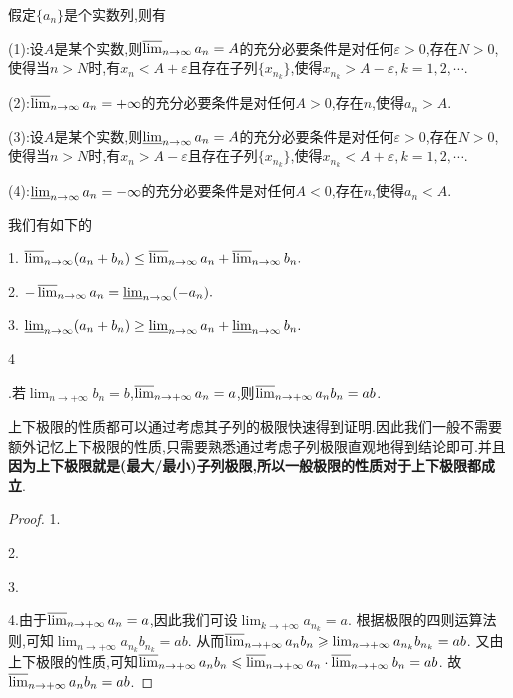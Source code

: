 \documentclass[lang=cn,newtx,10pt,scheme=chinese]{elegantbook}
\begin{document}
\begin{proposition}[上下极限的等价定义]\label{proposition:上下极限的等价定义}
假定\(\{a_n\}\)是个实数列,则有

(1):设\(A\)是某个实数,则\(\varlimsup_{n \to \infty} a_n = A\)的充分必要条件是对任何\(\varepsilon > 0\),存在$N>0$,使得当$n>N$时,有$x_n<A+\varepsilon$且存在子列$\{x_{n_k}\}$,使得$x_{n_k}>A-\varepsilon,k=1,2,\cdots$.

(2):\(\varlimsup_{n \to \infty} a_n = +\infty\)的充分必要条件是对任何\(A > 0\),存在\(n\),使得\(a_n > A\).

(3):设\(A\)是某个实数,则\(\varliminf_{n \to \infty} a_n = A\)的充分必要条件是对任何\(\varepsilon > 0\),存在$N>0$,使得当$n>N$时,有$x_n>A-\varepsilon$且存在子列$\{x_{n_k}\}$,使得$x_{n_k}<A+\varepsilon,k=1,2,\cdots$.

(4):\(\varliminf_{n \to \infty} a_n = -\infty\)的充分必要条件是对任何\(A < 0\),存在\(n\),使得\(a_n < A\).
\end{proposition}

\begin{proposition}[上下极限的性质]\label{proposition:上下极限的性质}
我们有如下的

1. $\varlimsup_{n \to \infty} (a_n + b_n) \leq \varlimsup_{n \to \infty} a_n + \varlimsup_{n \to \infty} b_n.$

2. $-\varlimsup_{n \to \infty} a_n = \varliminf_{n \to \infty} (-a_n).$

3. $\varliminf_{n \to \infty} (a_n + b_n) \geq \varliminf_{n \to \infty} a_n + \varliminf_{n \to \infty} b_n.$

\hypertarget{上极限的性质命题(4)}{4}.若\(\lim_{n \to +\infty} b_n = b\),\(\varlimsup_{n \to +\infty} a_n = a\),则\(\varlimsup_{n \to +\infty} a_n b_n = ab\).
\end{proposition}
\begin{note}
上下极限的性质都可以通过考虑其子列的极限快速得到证明.因此我们一般不需要额外记忆上下极限的性质,只需要熟悉通过考虑子列极限直观地得到结论即可.并且\textbf{因为上下极限就是(最大/最小)子列极限,所以一般极限的性质对于上下极限都成立}.
\end{note}
\begin{proof}
1.

2.

3.

4.由于\(\varlimsup_{n \to +\infty} a_n = a\),因此我们可设\(\lim_{k \to +\infty} a_{n_k} = a\).
根据极限的四则运算法则,可知\(\lim_{n \to +\infty} a_{n_k} b_{n_k} = ab\).
从而\(\varlimsup_{n \to +\infty} a_n b_n \geqslant \lim_{n \to +\infty} a_{n_k} b_{n_k} = ab\).
又由上下极限的性质,可知\(\varlimsup_{n \to +\infty} a_n b_n \leqslant \varlimsup_{n \to +\infty} a_n \cdot \varlimsup_{n \to +\infty} b_n = ab\).
故\(\varlimsup_{n \to +\infty} a_n b_n = ab\).
\end{proof}
\end{document}
